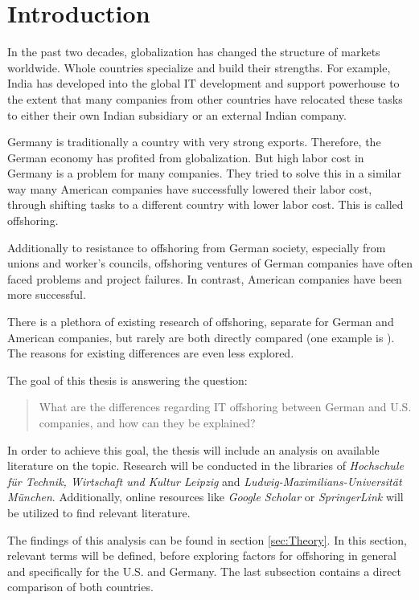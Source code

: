 \section{Introduction}
In the past two decades, globalization has changed the structure of markets worldwide. Whole countries specialize and build their strengths. For example, India has developed into the global IT development and support powerhouse to the extent that many companies from other countries have relocated these tasks to either their own Indian subsidiary or an external Indian company.

Germany is traditionally a country with very strong exports. Therefore, the German economy has profited from globalization. But high labor cost in Germany is a problem for many companies. They tried to solve this in a similar way many American companies have successfully lowered their labor cost, through shifting tasks to a different country with lower labor cost. This is called offshoring.

Additionally to resistance to offshoring from German society, especially from unions and worker's councils, offshoring ventures of German companies have often faced  problems and project failures. In contrast, American companies have been more successful.

There is a plethora of existing research of offshoring, separate for German and American companies, but rarely are both directly compared (one example is \cite{Hutzschenreuter.2007}). The reasons for existing differences are even less explored.

The goal of this thesis is answering the question:

\begin{quote}
	\centering
	What are the differences regarding IT offshoring between German and U.S. companies, and how can they be explained?
\end{quote}

In order to achieve this goal, the thesis will include an analysis on available literature on the topic. Research will be conducted in the libraries of \textit{Hochschule für Technik, Wirtschaft und Kultur Leipzig} and \textit{Ludwig-Maximilians-Universität München}. Additionally, online resources like \textit{Google Scholar} or \textit{SpringerLink} will be utilized to find relevant literature. 

The findings of this analysis can be found in section \ref{sec:Theory}. In this section, relevant terms will be defined, before exploring factors for offshoring in general and specifically for the U.S. and Germany. The last subsection contains a direct comparison of both countries.

